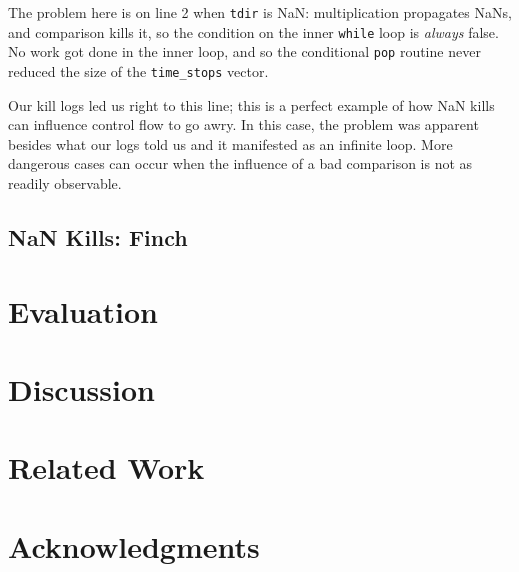 \documentclass{juliacon}
\begin{document}
The problem here is on line 2 when \texttt{tdir} is NaN: multiplication propagates NaNs, and comparison kills it, so the condition on the inner \texttt{while} loop is \emph{always} false.
No work got done in the inner loop, and so the conditional \texttt{pop} routine never reduced the size of the \texttt{time\_stops} vector.

Our kill logs led us right to this line; this is a perfect example of how NaN kills can influence control flow to go awry.
In this case, the problem was apparent besides what our logs told us and it manifested as an infinite loop.
More dangerous cases can occur when the influence of a bad comparison is not as readily observable.

\subsection{NaN Kills: Finch}


\section{Evaluation}

\section{Discussion}

\section{Related Work}

\section{Acknowledgments}


\end{document}
